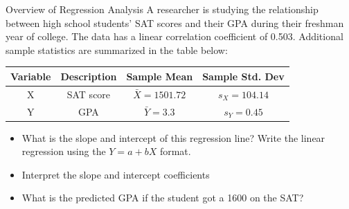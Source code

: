 \documentclass{beamer}
\begin{document}
\begin{frame}{Overview of Regression Analysis}
	\small{A researcher is studying the relationship between high school students' SAT scores and their GPA during their freshman year of college. The data has a linear correlation coefficient of 0.503. Additional sample statistics are summarized in the table below:}
	
	\footnotesize{ \begin{tabular}{|c|c|c|c|}
		\hline 
		Variable & Description & Sample Mean & Sample Std. Dev \\ [0.5ex]
		\hline
		\rule{0pt}{15pt} X & SAT score & $\bar{X}=1501.72$ & $s_X=104.14$ \\ [0.5ex]
		\hline
		\rule{0pt}{15pt} Y & GPA & $\bar{Y}=3.3$ & $s_Y=0.45$ \\ [0.5ex]
		\hline
		\end{tabular}}
	
	\begin{itemize}
		\item What is the slope and intercept of this regression line? Write the linear regression using the $Y=a+bX$ format.
		\item Interpret the slope and intercept coefficients
		\item What is the predicted GPA if the student got a 1600 on the SAT?
	\end{itemize}
\end{frame}
\end{document}
